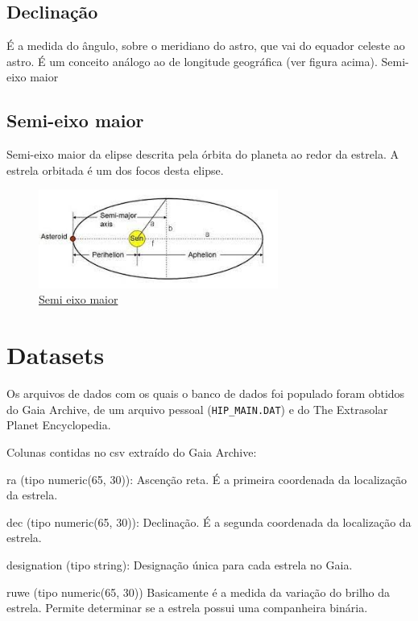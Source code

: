\documentclass[12pt, a4paper]{article}
\begin{document}
	\subsection{Declinação}
	É a medida do ângulo, sobre o meridiano do astro, que vai do equador celeste ao astro. É um conceito análogo ao de longitude geográfica (ver figura acima).
	Semi-eixo maior
	
	\subsection{Semi-eixo maior}
	Semi-eixo maior da elipse descrita pela órbita do planeta ao redor da estrela. A estrela orbitada é um dos focos desta elipse.

	\begin{figure}[h]
		\centering
		\includegraphics[width=0.7\textwidth]{semi_major_axis.png}
		\caption{ \href{https://astronomy.stackexchange.com/questions/23773/can-one-approximate-the-semi-major-axis-of-an-orbit-as-the-average-orbital-dista}{Semi eixo maior}}
		\label{fig:Semi_eixo_maior}
	\end{figure}

	\section{Datasets}
	
	Os arquivos de dados com os quais o banco de dados foi populado foram obtidos do Gaia Archive, de um arquivo pessoal (\verb|HIP_MAIN.DAT|) e do The Extrasolar Planet Encyclopedia.
	
	Colunas contidas no csv extraído do Gaia Archive:
	
	ra (tipo numeric(65, 30)):
	Ascenção reta. É a primeira coordenada da localização da estrela.
	
	dec (tipo numeric(65, 30)):
	Declinação. É a segunda coordenada da localização da estrela.
	
	designation (tipo string): 
	Designação única para cada estrela no Gaia.
	
	ruwe (tipo numeric(65, 30))
	Basicamente é a medida da variação do brilho da estrela. Permite determinar se a estrela possui uma companheira binária.
	
\end{document}
